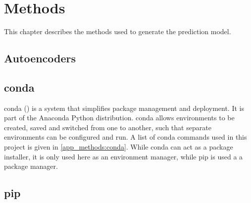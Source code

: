 

\chapter{Methods}
\label{Methods} 

This chapter describes the methods used to generate the prediction model.


\section{Autoencoders}


\section{conda}


conda (\cite{Conda2021}) is a system that simplifies package management and deployment. It is part of the Anaconda Python distribution. conda allows environments to be created, saved and switched from one to another, such that separate environments can be configured and run. A list of conda commands used in this project is given in \ref{app_methods:conda}. While conda can act as a package installer, it is only used here as an environment manager, while pip is used a a package manager.

\section{pip}

